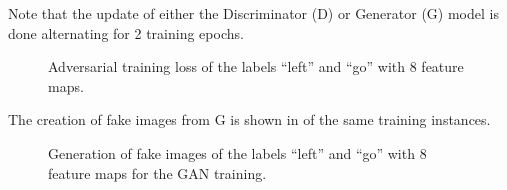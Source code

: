 Note that the update of either the Discriminator (D) or Generator (G) model is done alternating for 2 training epochs.
\begin{figure}[!ht]
  \centering
  \caption{Adversarial training loss of the labels \enquote{left} and \enquote{go} with 8 feature maps.}
  \label{fig:nn_adv_loss_label}
\end{figure}
\FloatBarrier
\noindent
The creation of fake images from G is shown in  of the same training instances.
\begin{figure}[!ht]
  \centering
  \caption{Generation of fake images of the labels \enquote{left} and \enquote{go} with 8 feature maps for the GAN training.}
  \label{fig:nn_adv_fakes_label}
\end{figure}
\FloatBarrier
\noindent

